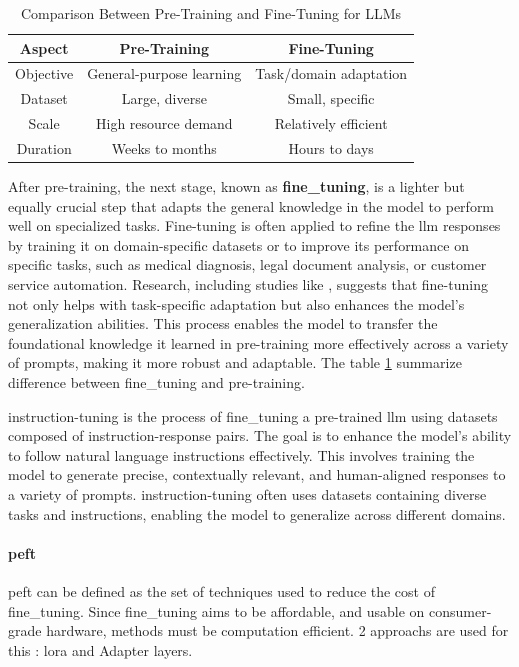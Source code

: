 \begin{table}[h!]
    \centering
    \begin{tabular}{|c|c|c|}
        \hline
        \textbf{Aspect} & \textbf{Pre-Training} & \textbf{Fine-Tuning} \\
        \hline
        Objective & General-purpose learning & Task/domain adaptation \\
        \hline
        Dataset & Large, diverse & Small, specific \\
        \hline
        Scale & High resource demand & Relatively efficient \\
        \hline
        Duration & Weeks to months & Hours to days \\
        \hline
    \end{tabular}
    \caption{Comparison Between Pre-Training and Fine-Tuning for LLMs}
    \label{tab:pretrain_vs_finetune}
\end{table}



After pre-training, the next stage, known as \textbf{\Gls{fine_tuning}}, is a lighter but equally crucial step that adapts the general knowledge in the model to perform well on specialized tasks. Fine-tuning is often applied to refine the \acrshort{llm} responses by training it on domain-specific datasets or to improve its performance on specific tasks, such as medical diagnosis, legal document analysis, or customer service automation. Research, including studies like \cite{wei_finetuned_2022}, suggests that fine-tuning not only helps with task-specific adaptation but also enhances the model's generalization abilities. This process enables the model to transfer the foundational knowledge it learned in pre-training more effectively across a variety of prompts, making it more robust and adaptable. The table \ref{tab:pretrain_vs_finetune} summarize difference between \gls{fine_tuning} and \gls{pre-training}.

\Gls{instruction-tuning} is the process of \gls{fine_tuning} a pre-trained \acrshort{llm} using datasets composed of instruction-response pairs. The goal is to enhance the model's ability to follow natural language instructions effectively. This involves training the model to generate precise, contextually relevant, and human-aligned responses to a variety of prompts. \Gls{instruction-tuning} often uses datasets containing diverse tasks and instructions, enabling the model to generalize across different domains. 

\paragraph{\acrfull{peft}}
\acrshort{peft} can be defined as the set of techniques used to reduce the cost of \gls{fine_tuning}. Since \gls{fine_tuning} aims to be affordable, and usable on consumer-grade hardware, methods must be computation efficient. 2 approachs are used for this : \acrfull{lora}  and Adapter layers.

